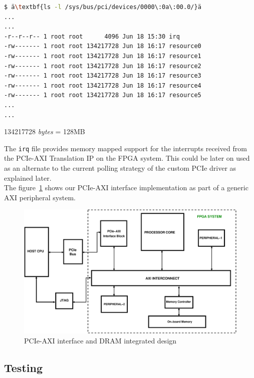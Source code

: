 \singlespacing
\scriptsize{
\begin{lstlisting}[language=bash, caption=Resource files, label={lst:resource}, emph={root, irq, resource0, resource1, resource2, resource3, resource4, resource5}]
$ ä\textbf{ls -l /sys/bus/pci/devices/0000\:0a\:00.0/}ä
...
...
-r--r--r-- 1 root root      4096 Jun 18 15:30 irq
-rw------- 1 root root 134217728 Jun 18 16:17 resource0
-rw------- 1 root root 134217728 Jun 18 16:17 resource1
-rw------- 1 root root 134217728 Jun 18 16:17 resource2
-rw------- 1 root root 134217728 Jun 18 16:17 resource3
-rw------- 1 root root 134217728 Jun 18 16:17 resource4
-rw------- 1 root root 134217728 Jun 18 16:17 resource5
...
...
\end{lstlisting}
}
\normalsize
\doublespacing

\begin{flushleft}
134217728 \textit{bytes} = 128MB\\
\end{flushleft}

The \verb|irq| file provides memory mapped support for the interrupts received from the PCIe-AXI Translation IP on the FPGA system.
This could be later on used as an alternate to the current polling strategy of the custom PCIe driver as explained later.\\
The figure~\ref{PCIe flow} shows our PCIe-AXI interface implementation as part of a generic AXI peripheral system.  

\begin{figure}[H]
\centering
\includegraphics[width=\textwidth]{eps_pdf_sources/ajit_fpga/DRAM_with_PCIe/DRAM_with_PCIe}
\caption{PCIe-AXI interface and DRAM integrated design}
\label{PCIe flow}
\end{figure}

\subsection{Testing}

